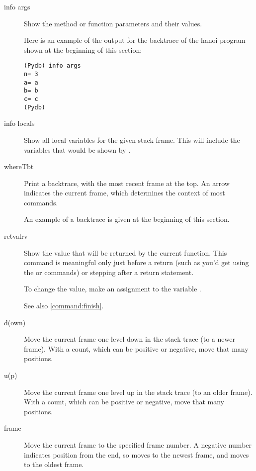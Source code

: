 \begin{description}

\item[info args]\label{command:info-args}

Show the method or function parameters and their values. 

Here is an example of the output for the backtrace of the hanoi
program shown at the beginning of this section:

\begin{verbatim}
(Pydb) info args
n= 3
a= a
b= b
c= c
(Pydb) 
\end{verbatim}

\item[info locals]\label{command:info-locals}

Show all local variables for the given stack frame. This will include
the variables that would be shown by .

\item[where\code{\Large{|}}T\code{\Large{|}}bt]

Print a backtrace, with the most recent frame at the top.  An
arrow indicates the current frame, which determines the context of
most commands.

An example of a backtrace is given at the beginning of this section.

\item[retval\code{\Large{|}}rv]\label{command:retval}

Show the value that will be returned by the current function. This
command is meaningful only just before a return (such as you'd get
using the  or  commands) or stepping after a
return statement.

To change the value, make an assignment to the variable
.

See also \ref{command:finish}.

\item[d(own) ]

Move the current frame one level down in the stack trace
(to a newer frame). With a count, which can be  positive
or  negative, move that many positions.

\item[u(p) ]

Move the current frame one level up in the stack trace (to an older
frame). With a count, which can be positive or negative,
move that many positions.

\item[frame ]
Move the current frame to the specified frame number. A negative
number indicates position from the end, so  moves to 
the newest frame, and  moves to the oldest frame.

\end{description}

